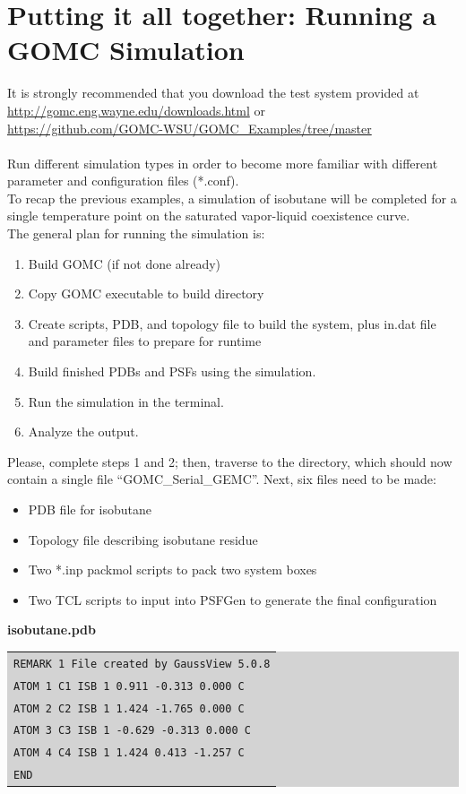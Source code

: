 \section{Putting it all together: Running a GOMC Simulation}
It is strongly recommended that you download the test system provided at\\
\url{http://gomc.eng.wayne.edu/downloads.html} or \\
\url{https://github.com/GOMC-WSU/GOMC_Examples/tree/master}\\\\
Run different simulation types in order to become more familiar with different parameter and configuration files (*.conf).\\
To recap the previous examples, a simulation of isobutane will be completed for a single temperature point on the saturated vapor-liquid coexistence curve.\\
The general plan for running the simulation is:
\begin{enumerate}
\item Build GOMC (if not done already)
\item Copy GOMC executable to build directory
\item Create scripts, PDB, and topology file to build the system, plus in.dat file and parameter files to prepare for runtime
\item Build finished PDBs and PSFs using the simulation.
\item Run the simulation in the terminal.
\item Analyze the output.
\end{enumerate}
Please, complete steps 1 and 2; then, traverse to the directory, which should now contain a single file ``GOMC\_Serial\_GEMC''.
Next, six files need to be made:
\begin{itemize}
\item PDB file for isobutane
\item Topology file describing isobutane residue
\item Two *.inp packmol scripts to pack two system boxes
\item Two TCL scripts to input into PSFGen to generate the final configuration
\end{itemize}
\textbf{isobutane.pdb}\\
\colorbox{lightgray}{
\begin{tabular}{l}
\texttt{REMARK   1 File created by GaussView 5.0.8}\\
\texttt{ATOM      1 C1   ISB     1       0.911  -0.313   0.000		C}\\
\texttt{ATOM      2 C2   ISB     1       1.424  -1.765   0.000		C}\\
\texttt{ATOM      3 C3   ISB     1      -0.629  -0.313   0.000		C}\\
\texttt{ATOM      4 C4   ISB     1       1.424   0.413  -1.257		C}\\
\texttt{END}\\
\end{tabular}}\\\\
